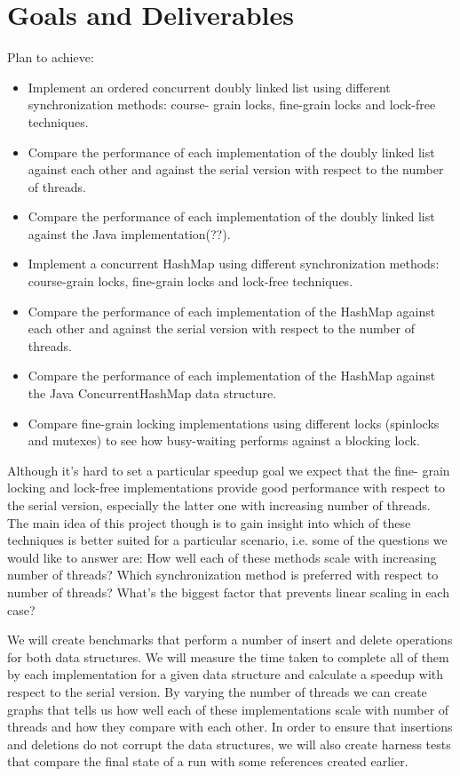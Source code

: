 \documentclass[11pt]{article}
\begin{document}
\section*{Goals and Deliverables}  
Plan to achieve: 
\begin{itemize} 
\item
Implement an ordered concurrent doubly linked list using different
synchronization methods: course- grain locks, fine-grain locks and lock-free
techniques. 
\item Compare the performance of each implementation of the doubly
linked list against each other and against the serial version with respect to
the number of threads. 
\item Compare the performance of each implementation of
the doubly linked list against the Java implementation(??). 
\item Implement a
concurrent HashMap using different synchronization methods: course-grain locks,
fine-grain locks  and lock-free techniques. 
\item Compare the performance of
each implementation of the HashMap against each other and against the serial
version with respect to the number of threads. 
\item Compare the performance of
each implementation of the HashMap against the Java ConcurrentHashMap data
structure.
\end{itemize}

\begin{itemize}
Desirables: 
\item
Compare fine-grain locking implementations using different locks
(spinlocks and mutexes) to see how busy-waiting performs against a blocking
lock.
\end{itemize}

Although it’s hard to set a particular speedup goal we expect that the fine-
grain locking and lock-free implementations provide good performance with
respect to the serial version, especially the latter one with increasing number
of threads. The main idea of this project though is to gain insight into which
of these techniques is better suited for a particular scenario, i.e. some of the
questions we would like to answer are: How well each of these methods scale with
increasing number of threads? Which synchronization method is preferred with
respect to number of threads? What’s the biggest factor that prevents linear
scaling in each case?

We will create benchmarks that perform a number of insert and delete operations
for both data structures. We will measure the time taken to complete all of them
by each implementation for a given data structure and calculate a speedup with
respect to the serial version. By varying the number of threads we can create
graphs that tells us how well each of these implementations scale with number of
threads and how they compare with each other. In order to ensure that insertions
and deletions do not corrupt the data structures, we will also create harness
tests that compare the final state of a run with some references created
earlier.
\end{document}
